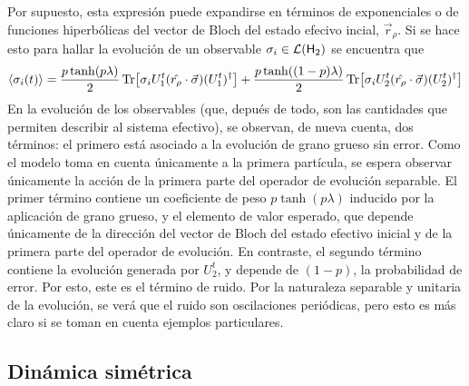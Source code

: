 Por supuesto, esta expresión puede expandirse en términos de exponenciales o de funciones hiperbólicas del vector de Bloch del estado efecivo incial, $\vec{r}_{\rho}$. Si se hace esto para hallar la evolución de un observable $\sigma_{i}\in\mathcal{L}({\sf H}_{2})$ se encuentra que
\begin{equation*}
    \expval{\sigma_{i}(t)}=\frac{p\tanh(p\lambda)}{2}\Tr[\sigma_{i}U_{1}^{t}(\hat{r_{\rho}}\cdot\vec{\sigma})(U_{1}^{t})^{\dag}]+\frac{p\tanh((1-p)\lambda)}{2}\Tr[\sigma_{i}U_{2}^{t}(\hat{r_{\rho}}\cdot\vec{\sigma})(U_{2}^{t})^{\dag}]
\end{equation*}
En la evolución de los observables (que, depués de todo, son las cantidades que permiten describir al sistema efectivo), se observan, de nueva cuenta, dos términos: el primero está asociado a la evolución de grano grueso sin error. Como el modelo toma en cuenta únicamente a la primera partícula, se espera observar únicamente la acción de la primera parte del operador de evolución separable. El primer término contiene un coeficiente de peso $p\tanh(p\lambda)$ inducido por la aplicación de grano grueso, y el elemento de valor esperado, que depende únicamente de la dirección del vector de Bloch del estado efectivo inicial y de la primera parte del operador de evolución. En contraste, el segundo término contiene la evolución generada por $U_{2}^{t}$, y depende de $(1-p)$, la probabilidad de error. Por esto, este es el término de ruido. Por la naturaleza separable y unitaria de la evolución, se verá que el ruido son oscilaciones periódicas, pero esto es más claro si se toman en cuenta ejemplos particulares.

\subsection{Dinámica simétrica}


